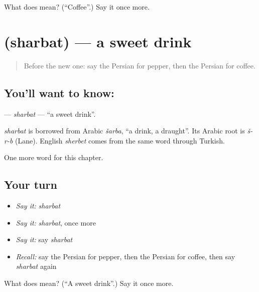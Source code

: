 \begin{tcolorbox}[breakable,colback=teal!4,colframe=teal!35!black,title={Before you move on}]
What does  mean? (\textquotedblleft{}Coffee\textquotedblright{}.) Say it once more.
\end{tcolorbox}
\section[\texorpdfstring{\fa{شربت} (sharbat)}{شربت (sharbat)}]{ (sharbat) — a sweet drink}

\label{lesson:FA-C102-sharbat}



\begin{quote}
Before the new one: say the Persian for pepper, then the Persian for coffee.
\end{quote}

\subsection*{You'll want to know: }
\textbf{} — \emph{sharbat} — \textquotedblleft{}a sweet drink\textquotedblright{}.

\begin{cousinweb}
\emph{sharbat} is borrowed from Arabic \emph{šarba}, \textquotedblleft{}a drink, a draught\textquotedblright{}. Its Arabic root is \emph{š-r-b} (Lane). English \emph{sherbet} comes from the same word through Turkish.
\end{cousinweb}

\begin{grammarlens}[title={What you've built}]
One more word for this chapter.
\end{grammarlens}

\subsection*{Your turn}
\begin{itemize}
\raggedright
  \item \emph{Say it:} \emph{sharbat}
  \item \emph{Say it:} \emph{sharbat}, once more
  \item \emph{Say it:} say \emph{sharbat}
  \item \emph{Recall:} say the Persian for pepper, then the Persian for coffee, then say \emph{sharbat} again
\end{itemize}

\begin{tcolorbox}[breakable,colback=teal!4,colframe=teal!35!black,title={Before you move on}]
What does  mean? (\textquotedblleft{}A sweet drink\textquotedblright{}.) Say it once more.
\end{tcolorbox}
